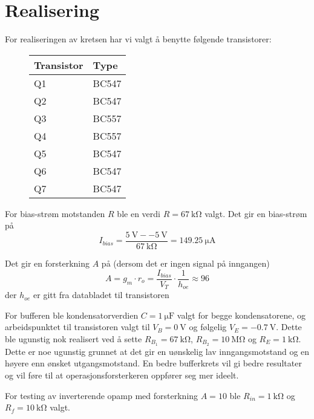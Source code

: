 \section{Realisering}
\label{realisering}

For realiseringen av kretsen har vi valgt å benytte følgende transistorer:
\begin{figure}[H]
    \centering
    \begin{tabularx}{0.5\textwidth}{|X|X|}
        \hline
        \textbf{Transistor} & \textbf{Type}\\
        \hline
        Q1 & BC547 \\
        Q2 & BC547 \\
        Q3 & BC557 \\
        Q4 & BC557 \\
        Q5 & BC547 \\
        Q6 & BC547 \\
        Q7 & BC547 \\
        \hline
    \end{tabularx}
\end{figure}

For bias-strøm motstanden $R$ ble en verdi $R = \SI{67}{\kilo\ohm}$ valgt. Det gir en bias-strøm
på 
\[
    I_{bias} = \frac{\SI{5}{\volt} - \SI{-5}{\volt}}{\SI{67}{\kilo\ohm}} = \SI{149.25}{\micro\ampere}
\]

Det gir en forsterkning $A$ på (dersom det er ingen signal på inngangen)
\[
    A = g_m \cdot r_o = \frac{I_{bias}}{V_T} \cdot \frac{1}{h_{oe}} \approx 96
\]
der $h_{oe}$ er gitt fra databladet til transistoren \cite{bc557}

For bufferen ble kondensatorverdien $C = \SI{1}{\micro\farad}$ valgt for begge kondensatorene, og 
arbeidspunktet til transistoren valgt til $V_{B} = \SI{0}{\volt}$ og følgelig $V_{E} = \SI{-0.7}{\volt}$.
Dette ble ugunstig nok realisert ved å sette $R_{B_1} = \SI{67}{\kilo\ohm}$, $R_{B_2} = \SI{10}{\mega\ohm}$
og $R_{E} = \SI{1}{\kilo\ohm}$. Dette er noe ugunstig grunnet at det gir en uønskelig lav 
inngangsmotstand og en høyere enn ønsket utgangsmotstand. En bedre bufferkrets vil gi bedre resultater og 
vil føre til at operasjonsforsterkeren oppfører seg mer ideelt.

For testing av inverterende opamp med forsterkning $A = 10$ ble $R_{in} = \SI{1}{\kilo\ohm}$ og $R_{f} = \SI{10}{\kilo\ohm}$ valgt.
